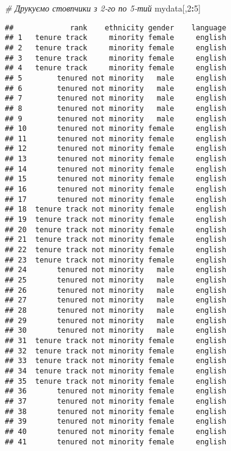 \documentclass[
]{article}
\newenvironment{Shaded}{\begin{snugshade}}{\end{snugshade}}
\newcommand{\CommentTok}[1]{\textcolor[rgb]{0.56,0.35,0.01}{\textit{#1}}}
\newcommand{\DecValTok}[1]{\textcolor[rgb]{0.00,0.00,0.81}{#1}}
\newcommand{\NormalTok}[1]{#1}
\newcommand{\OperatorTok}[1]{\textcolor[rgb]{0.81,0.36,0.00}{\textbf{#1}}}
\begin{document}
\begin{Shaded}
\begin{Highlighting}[]
\CommentTok{# Друкуємо стовпчики з 2-го по 5-тий}
\NormalTok{mydata[,}\DecValTok{2}\OperatorTok{:}\DecValTok{5}\NormalTok{]}
\end{Highlighting}
\end{Shaded}

\begin{verbatim}
##             rank    ethnicity gender    language
## 1   tenure track     minority female     english
## 2   tenure track     minority female     english
## 3   tenure track     minority female     english
## 4   tenure track     minority female     english
## 5        tenured not minority   male     english
## 6        tenured not minority   male     english
## 7        tenured not minority   male     english
## 8        tenured not minority   male     english
## 9        tenured not minority   male     english
## 10       tenured not minority female     english
## 11       tenured not minority female     english
## 12       tenured not minority female     english
## 13       tenured not minority female     english
## 14       tenured not minority female     english
## 15       tenured not minority female     english
## 16       tenured not minority female     english
## 17       tenured not minority female     english
## 18  tenure track not minority female     english
## 19  tenure track not minority female     english
## 20  tenure track not minority female     english
## 21  tenure track not minority female     english
## 22  tenure track not minority female     english
## 23  tenure track not minority female     english
## 24       tenured not minority   male     english
## 25       tenured not minority   male     english
## 26       tenured not minority   male     english
## 27       tenured not minority   male     english
## 28       tenured not minority   male     english
## 29       tenured not minority   male     english
## 30       tenured not minority   male     english
## 31  tenure track not minority female     english
## 32  tenure track not minority female     english
## 33  tenure track not minority female     english
## 34  tenure track not minority female     english
## 35  tenure track not minority female     english
## 36       tenured not minority female     english
## 37       tenured not minority female     english
## 38       tenured not minority female     english
## 39       tenured not minority female     english
## 40       tenured not minority female     english
## 41       tenured not minority female     english

\end{verbatim}
\end{document}
